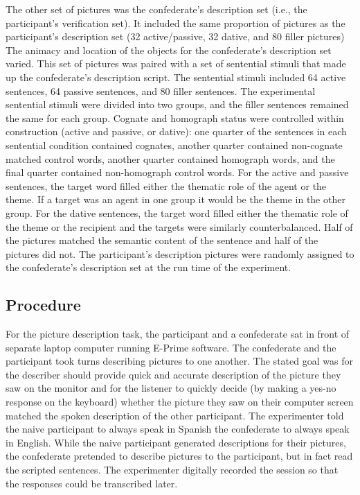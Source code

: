 The other set of pictures was the confederate's description set (i.e., the participant's verification set). It included the same proportion of pictures as the participant's description set (32 active\slash passive, 32 dative, and 80 filler pictures) The animacy and location of the objects for the confederate's description set varied. This set of pictures was paired with a set of sentential stimuli that made up the confederate's description script. The sentential stimuli included 64 active sentences, 64 passive sentences, and 80 filler sentences. The experimental sentential stimuli were divided into two groups, and the filler sentences remained the same for each group. Cognate and homograph status were controlled within construction (active and passive, or dative): one quarter of the sentences in each sentential condition contained cognates, another quarter contained non-cognate matched control words, another quarter contained homograph words, and the final quarter contained non-homograph control words. For the active and passive sentences, the target word filled either the thematic role of the agent or the theme. If a target was an agent in one group it would be the theme in the other group. For the dative sentences, the target word filled either the thematic role of the theme or the recipient and the targets were similarly counterbalanced. Half of the pictures matched the semantic content of the sentence and half of the pictures did not. The participant's description pictures were randomly assigned to the confederate's description set at the run time of the experiment. 

\subsection{Procedure}
\label{procedure}

For the picture description task, the participant and a confederate sat in front of separate laptop computer running E-Prime software. The confederate and the participant took turns describing pictures to one another. The stated goal was for the describer should provide quick and accurate description of the picture they saw on the monitor and for the listener to quickly decide (by making a yes-no response on the keyboard) whether the picture they saw on their computer screen matched the spoken description of the other participant. The experimenter told the naive participant to always speak in Spanish the confederate to always speak in English. While the naive participant generated descriptions for their pictures, the confederate pretended to describe pictures to the participant, but in fact read the scripted sentences. The experimenter digitally recorded the session so that the responses could be transcribed later. 

